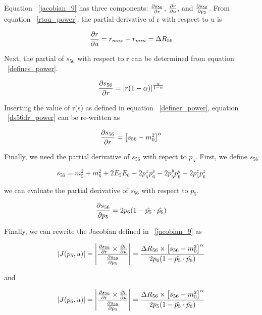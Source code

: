Equation ~\ref{jacobian_9} has three components: $\frac{\partial s_{56}}{\partial r}$,
$\frac{\partial r}{\partial u}$, and $\frac{\partial s_{56}}{\partial p_{5}}$. From equation ~\ref{rtou_power}, the
partial derivative of r with respect to u is 

\begin{equation}
\label{drdu_power}
\frac{\partial r}{\partial u} = r_{max} - r_{min} = \Delta R_{56}
\end{equation}

Next, the partial of $s_{56}$ with respect to r can be determined from equation ~\ref{defines_power}.

\begin{equation}
\label{ds56dr_power}
\frac{\partial s_{56}}{\partial r} = \left[ r(1-\alpha) \right]^{\frac{\alpha}{1-\alpha}}
\end{equation}

Inserting the value of r(s) as defined in equation ~\ref{definer_power}, equation ~\ref{ds56dr_power} can be re-written as

\begin{equation}
\label{ds56dr_power2}
\frac{\partial s_{56}}{\partial r} = \left[ s_{56} - m_{0}^{2} \right]^{\alpha}
\end{equation}

Finally, we need the partial derivative of $s_{56}$ with repect to $p_{5}$. First, we define $s_{56}$

\begin{equation}
\label{defines56_power}
s_{56} = m_{5}^{2} + m_{6}^{2} + 2E_{5}E_{6} - 2p_{5}^{x}p_{6}^{x} - 2p_{5}^{y}p_{6}^{y} - 2p_{5}^{z}p_{6}^{z}
\end{equation}

we can evaluate the partial derivative of $s_{56}$ with respect to $p_{5}$.

\begin{equation}
\label{ds56dp5_power}
\frac{\partial s_{56}}{\partial p_{5}} = 2p_{6}(1 - \hat{p_{5}} \cdot \hat{p_{6}})
\end{equation}

Finally, we can rewrite the Jacobian defined in ~\ref{jacobian_9} as

\begin{equation}
\label{jacobian_10}
|J(p_{5}, u)| = \left | \frac{\frac{\partial s_{56}}{\partial r} \times
\frac{\partial r}{\partial u}}{\frac{\partial s_{56}}{\partial p_{5}}} \right | = \frac{\Delta R_{56} \times \left[ s_{56}-m_{0}^{2} \right]^{\alpha}}{2p_{6}(1 - \hat{p_{5}} \cdot \hat{p_{6}})}
\end{equation}

and 

\begin{equation}
\label{jacobian_11}
|J(p_{6}, u)| = \left | \frac{\frac{\partial s_{56}}{\partial r} \times
\frac{\partial r}{\partial u}}{\frac{\partial s_{56}}{\partial p_{6}}} \right | = \frac{\Delta R_{56} \times \left[ s_{56}-m_{0}^{2} \right]^{\alpha}}{2p_{5}(1 - \hat{p_{5}} \cdot \hat{p_{6}})}
\end{equation}

